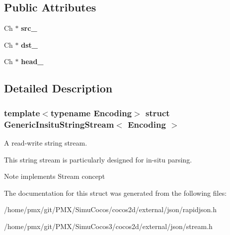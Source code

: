\subsection*{Public Attributes}
\begin{DoxyCompactItemize}
\item 
\mbox{\label{structGenericInsituStringStream_a35ce3e496639c8a616d85b1736b1f407}} 
Ch $\ast$ {\bfseries src\+\_\+}
\item 
\mbox{\label{structGenericInsituStringStream_a3e6582dc802fefd92b05c7bcc50c7fc1}} 
Ch $\ast$ {\bfseries dst\+\_\+}
\item 
\mbox{\label{structGenericInsituStringStream_a314209f1537cacf732848f6a7719a1d8}} 
Ch $\ast$ {\bfseries head\+\_\+}
\end{DoxyCompactItemize}


\subsection{Detailed Description}
\subsubsection*{template$<$typename Encoding$>$\newline
struct Generic\+Insitu\+String\+Stream$<$ Encoding $>$}

A read-\/write string stream. 

This string stream is particularly designed for in-\/situ parsing. \begin{DoxyNote}{Note}
implements Stream concept 
\end{DoxyNote}


The documentation for this struct was generated from the following files\+:\begin{DoxyCompactItemize}
\item 
/home/pmx/git/\+P\+M\+X/\+Simu\+Cocos/cocos2d/external/json/rapidjson.\+h\item 
/home/pmx/git/\+P\+M\+X/\+Simu\+Cocos3/cocos2d/external/json/stream.\+h\end{DoxyCompactItemize}
